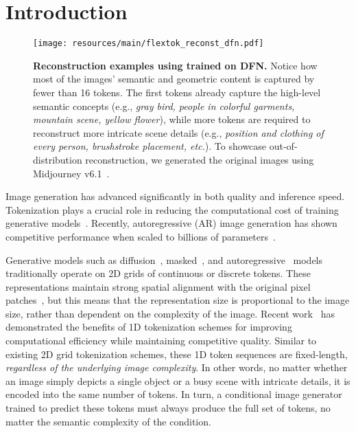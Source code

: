 \section{Introduction}
\label{sec:intro}

\begin{figure*}[ht!]
\centering
\texttt{[image: resources/main/flextok\_reconst\_dfn.pdf]}
\vspace{-1.5em}
\caption{
\textbf{Reconstruction examples using \oursxlarge trained on DFN.} Notice how most of the images' semantic and geometric content is captured by fewer than 16 tokens. The first tokens already capture the high-level semantic concepts (e.g., \textit{gray bird, people in colorful garments, mountain scene, yellow flower}), while more tokens are required to reconstruct more intricate scene details (e.g., \textit{position and clothing of every person, brushstroke placement, etc.}). To showcase out-of-distribution reconstruction, we generated the original images using Midjourney v6.1~\cite{midjourneyv61}.
}
\label{fig:reconst_dfn}
\end{figure*}

Image generation has advanced significantly in both quality and inference speed. Tokenization plays a crucial role in reducing the computational cost of training generative models~\cite{van2017neural, esser2021taming}. Recently, autoregressive (AR) image generation has shown competitive performance when scaled to billions of parameters~\cite{sun2024autoregressive}. 

Generative models such as diffusion~\cite{rombach2022high, peebles2023scalable}, masked~\cite{Chang2022MaskGIT, Chang2023Muse}, and autoregressive~\cite{Chen2020iGPT,Yu2022Parti} models traditionally operate on 2D grids of continuous or discrete tokens. These representations maintain strong spatial alignment with the original pixel patches~\cite{esser2021taming, mentzer2023fsq}, but this means that the representation size is proportional to the image size, rather than dependent on the complexity of the image.
Recent work~\cite{yu2024titok} has demonstrated the benefits of 1D tokenization schemes for improving computational efficiency while maintaining competitive quality. Similar to existing 2D grid tokenization schemes, these 1D token sequences are fixed-length, \textit{regardless of the underlying image complexity}. In other words, no matter whether an image simply depicts a single object or a busy scene with intricate details, it is encoded into the same number of tokens. In turn, a conditional image generator trained to predict these tokens must always produce the full set of tokens, no matter the semantic complexity of the condition. 

